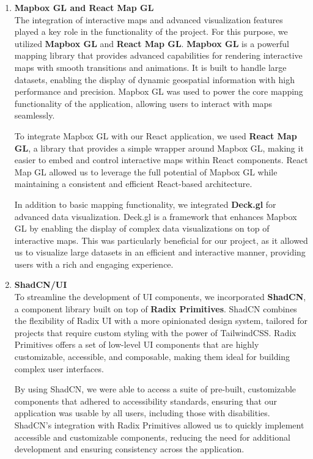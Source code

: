 \begin{enumerate}
    \item{} \textbf{Mapbox GL and React Map GL} \\
    The integration of interactive maps and advanced visualization features played a key role in the functionality of the project. For this purpose, we utilized \textbf{Mapbox GL} and \textbf{React Map GL}. \textbf{Mapbox GL} is a powerful mapping library that provides advanced capabilities for rendering interactive maps with smooth transitions and animations. It is built to handle large datasets, enabling the display of dynamic geospatial information with high performance and precision. Mapbox GL was used to power the core mapping functionality of the application, allowing users to interact with maps seamlessly.

    To integrate Mapbox GL with our React application, we used \textbf{React Map GL}, a library that provides a simple wrapper around Mapbox GL, making it easier to embed and control interactive maps within React components. React Map GL allowed us to leverage the full potential of Mapbox GL while maintaining a consistent and efficient React{-}based architecture.

    In addition to basic mapping functionality, we integrated \textbf{Deck.gl} for advanced data visualization. Deck.gl is a framework that enhances Mapbox GL by enabling the display of complex data visualizations on top of interactive maps. This was particularly beneficial for our project, as it allowed us to visualize large datasets in an efficient and interactive manner, providing users with a rich and engaging experience.

    \item{} \textbf{ShadCN/UI} \\
    To streamline the development of UI components, we incorporated \textbf{ShadCN}, a component library built on top of \textbf{Radix Primitives}. ShadCN combines the flexibility of Radix UI with a more opinionated design system, tailored for projects that require custom styling with the power of TailwindCSS\@. Radix Primitives offers a set of low{-}level UI components that are highly customizable, accessible, and composable, making them ideal for building complex user interfaces.

    By using ShadCN, we were able to access a suite of pre{-}built, customizable components that adhered to accessibility standards, ensuring that our application was usable by all users, including those with disabilities. ShadCN's integration with Radix Primitives allowed us to quickly implement accessible and customizable components, reducing the need for additional development and ensuring consistency across the application.


\end{enumerate}
